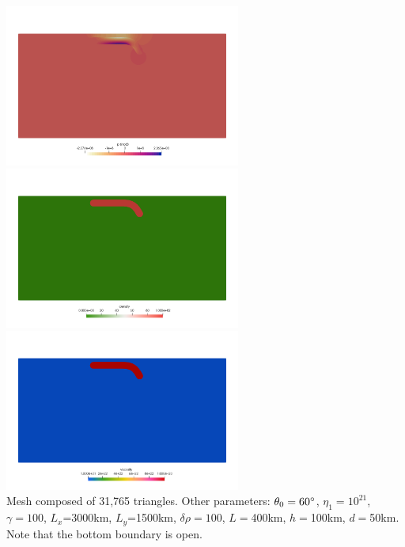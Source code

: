 \begin{center}
\includegraphics[width=7.75cm]{python_codes/fieldstone_55/images/press}\\
\includegraphics[width=7.75cm]{python_codes/fieldstone_55/images/rho}
\includegraphics[width=7.75cm]{python_codes/fieldstone_55/images/eta}\\
{\captionfont Mesh composed of 31,765 triangles.
Other parameters: $\theta_0=60\degree$, $\eta_1=10^{21}$, $\gamma=100$, 
$L_x$=3000km, $L_y$=1500km, $\delta\rho=100$, $L=$400km, $h=$100km, $d=$50km. 
Note that the bottom boundary is open.}
\end{center}


